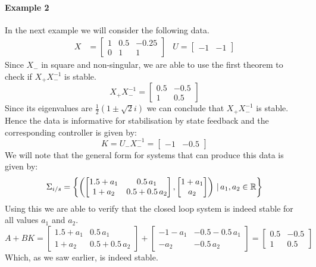 \paragraph*{Example 2 \cite[Example 19]{waarde2019data}}
In the next example we will consider the following data.
\begin{align*}
X &= \begin{bmatrix} 1&0.5&-0.25 \\ 0&1&1 \end{bmatrix} & U = \begin{bmatrix}	-1&-1	\end{bmatrix}
\end{align*}
Since $X_-$ in square and non-singular, we are able to use the first theorem to check if $X_+ X_-^{-1}$ is stable.
\[ X_+ X_-^{-1} = \begin{bmatrix} 0.5&-0.5\\1&0.5 \end{bmatrix} \]
Since its eigenvalues are $\frac{1}{2}(1 \pm \sqrt{2}i)$ we can conclude that $X_+ X_-^{-1}$ is stable. Hence the data is informative for stabilisation by state feedback and the corresponding controller is given by:
\[ K = U_- X_-^{-1} = \begin{bmatrix} -1 & -0.5 \end{bmatrix} \]
We will note that the general form for systems that can produce this data is given by:
\[ \Sigma_{i/s} = \left\{ \left( \begin{bmatrix} 1.5+a_1&0.5 \, a_1 \\ 1 + a_2 &0.5 + 0.5 \, a_2 \end{bmatrix}, \begin{bmatrix} 1 + a_1 \\ a_2 \end{bmatrix} \right) \, | \, a_1, a_2 \in \mathbb{R} \right\} \]
Using this we are able to verify that the closed loop system is indeed stable for all values $a_1$ and $a_2$.
\begin{equation*}
	A + BK = \begin{bmatrix} 1.5+a_1&0.5 \, a_1 \\ 1 + a_2 &0.5 + 0.5 \, a_2 \end{bmatrix} + \begin{bmatrix} - 1 - a_1 &  - 0.5 - 0.5 \, a_1 \\ -a_2 & -0.5 \, a_2 \end{bmatrix} = \begin{bmatrix} 0.5&-0.5\\1&0.5 \end{bmatrix}
\end{equation*}
Which, as we saw earlier, is indeed stable.

